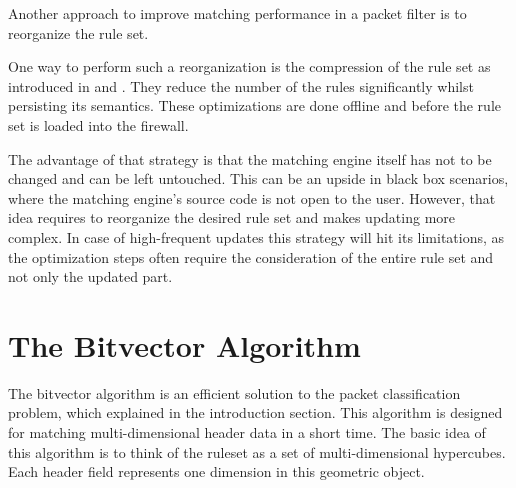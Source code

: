 \documentclass[a4paper,
		12pt,
		parskip=full,
		titlepage
		]{scrartcl}
\begin{document}
Another approach to improve matching performance in a packet filter is to reorganize the rule set.

One way to perform such a reorganization is the compression of the rule set as introduced in \cite{firewall_compressor} and \cite{redundancy_removal}.
They reduce the number of the rules significantly whilst persisting its semantics.
These optimizations are done offline and before the rule set is loaded into the firewall.

The advantage of that strategy is that the matching engine itself has not to be changed and can be left untouched.
This can be an upside in black box scenarios, where the matching engine's source code is not open to the user.
However, that idea requires to reorganize the desired rule set and makes updating more complex.
In case of high-frequent updates this strategy will hit its limitations, as the optimization steps often require the consideration of the entire rule set and not only the updated part.

\section{The Bitvector Algorithm}
The bitvector algorithm \cite{bv} is an efficient solution to the packet classification problem, which explained in the introduction section.
This algorithm is designed for matching multi-dimensional header data in a short time.
The basic idea of this algorithm is to think of the ruleset as a set of multi-dimensional hypercubes.
Each header field represents one dimension in this geometric object.

\newpage
{}


\end{document}
